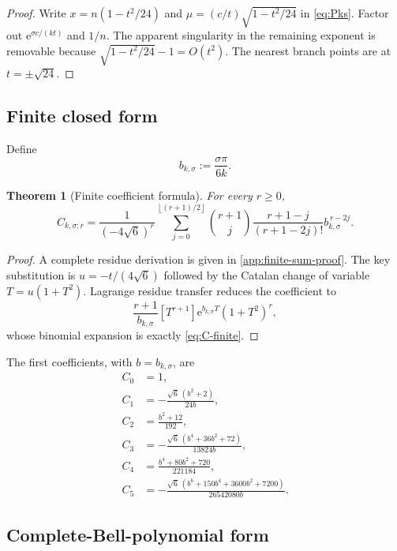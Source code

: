 \documentclass[11pt,a4paper]{article}
\numberwithin{equation}{section}
\newtheorem{theorem}{Theorem}[section]
\theoremstyle{definition}
\theoremstyle{remark}
\newcommand{\e}{\mathrm e}
\newcommand{\floor}[1]{\left\lfloor#1\right\rfloor}
\begin{document}
\begin{proof}
Write $x=n(1-t^2/24)$ and
$\mu=(c/t)\sqrt{1-t^2/24}$ in \eqref{eq:Pks}.  Factor out
$\e^{\sigma c/(kt)}$ and $1/n$.  The apparent singularity in the remaining
exponent is removable because
$\sqrt{1-t^2/24}-1=O(t^2)$.  The nearest branch points are at
$t=\pm\sqrt{24}$.
\end{proof}

\subsection{Finite closed form}

Define
\begin{equation}\label{eq:bks}
 b_{k,\sigma}:=\frac{\sigma\pi}{6k}.
\end{equation}

\begin{theorem}[Finite coefficient formula]\label{thm:C-finite}
For every $r\geq0$,
\begin{equation}\label{eq:C-finite}
 \boxed{
 C_{k,\sigma;r}=\frac1{(-4\sqrt6)^r}
 \sum_{j=0}^{\floor{(r+1)/2}}
 \binom{r+1}{j}\frac{r+1-j}{(r+1-2j)!}
 b_{k,\sigma}^{\,r-2j}.}
\end{equation}
\end{theorem}

\begin{proof}
A complete residue derivation is given in \cref{app:finite-sum-proof}.  The key
substitution is $u=-t/(4\sqrt6)$ followed by the Catalan change of variable
$T=u(1+T^2)$.  Lagrange residue transfer reduces the coefficient to
\[
 \frac{r+1}{b_{k,\sigma}}
 [T^{r+1}]\e^{b_{k,\sigma}T}(1+T^2)^r,
\]
whose binomial expansion is exactly \eqref{eq:C-finite}.
\end{proof}

The first coefficients, with $b=b_{k,\sigma}$, are
\begin{align}
 C_0&=1,\nonumber\\
 C_1&=-\frac{\sqrt6\,(b^2+2)}{24b},\nonumber\\
 C_2&=\frac{b^2+12}{192},\nonumber\\
 C_3&=-\frac{\sqrt6\,(b^4+36b^2+72)}{13824b},
 \label{eq:C-first}\\
 C_4&=\frac{b^4+80b^2+720}{221184},\nonumber\\
 C_5&=-\frac{\sqrt6\,(b^6+150b^4+3600b^2+7200)}{26542080b}.
 \nonumber
\end{align}

\subsection{Complete-Bell-polynomial form}
\end{document}
